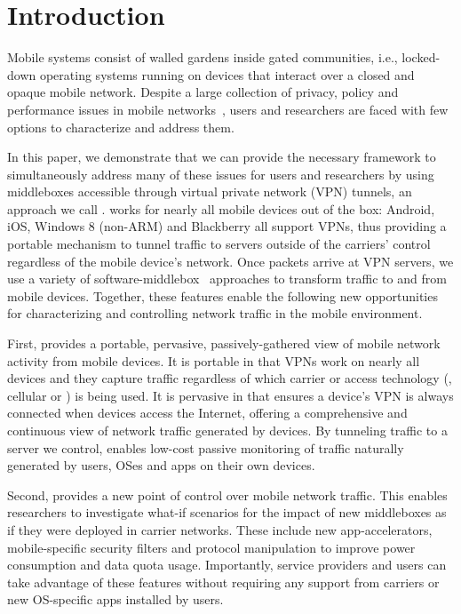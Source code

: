 \section{Introduction}
\label{sec:introduction}

Mobile systems consist of walled gardens inside gated 
communities, i.e., locked-down operating systems running on 
devices that interact over a closed and opaque mobile network. 
Despite a large collection of privacy, policy and performance issues
in mobile networks~\cite{enck:taintdroid,hornyack:appfence,speedtest,pathak:eprof},
users and researchers are faced with few options to  
characterize and address them.

In this paper, we demonstrate that we can provide the necessary framework to
simultaneously address many of these issues for users and researchers by using
middleboxes accessible through virtual private network (VPN) tunnels, an approach we call
\meddle.  \meddle works for nearly all mobile devices out of the box:
Android, iOS, Windows 8 (non-ARM) and Blackberry all support VPNs, thus providing a
portable mechanism to tunnel traffic to servers outside of the
carriers' control regardless of the mobile device's network.  Once
packets arrive at VPN servers, we use a variety of software-middlebox~\cite{sherry:middleboxes}
approaches to transform traffic to and from mobile devices. Together, 
these features enable the following new opportunities for characterizing and 
controlling network traffic in the mobile environment.

First, \meddle provides a portable, pervasive, passively-gathered view of mobile network activity 
from mobile devices. It is portable in that VPNs work on nearly all 
devices and they capture traffic regardless of which carrier or access technology (\eg, 
cellular or \wifi) is being used. It is pervasive in that \meddle ensures a 
device's VPN is always connected when devices access the Internet, offering 
a comprehensive and continuous view of network traffic generated by devices. By tunneling traffic to a server we control, \meddle enables low-cost passive monitoring 
of traffic naturally generated by users, OSes and apps on their own devices.

Second, \meddle provides a new point of control over mobile 
network traffic. This  
enables researchers to investigate what-if scenarios for the 
impact of new middleboxes as if they were deployed in carrier 
networks. These include new app-accelerators, 
mobile-specific security filters and protocol manipulation 
to improve power consumption and data quota usage. Importantly, 
service providers and users can take advantage of these features 
without requiring any support from carriers or new OS-specific 
apps installed by users.

